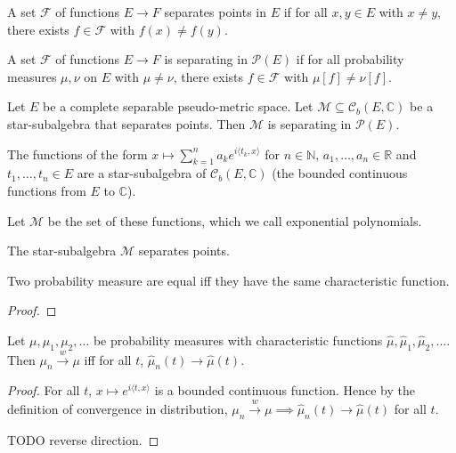 \begin{definition}\label{def:separating}
A set $\mathcal F$ of functions $E \to F$ separates points in $E$ if for all $x, y \in E$ with $x \ne y$, there exists $f \in \mathcal F$ with $f(x) \ne f(y)$.

A set $\mathcal F$ of functions $E \to F$ is separating in $\mathcal P(E)$ if for all probability measures $\mu, \nu$ on $E$ with $\mu \ne \nu$, there exists $f \in \mathcal F$ with $\mu[f] \ne \nu[f]$.
\end{definition}

\begin{theorem}\label{thm:separating_starSubalgebra}
Let $E$ be a complete separable pseudo-metric space. Let $\mathcal M \subseteq \mathcal C_b(E, \mathbb{C})$ be a star-subalgebra that separates points. Then $\mathcal M$ is separating in $\mathcal P(E)$.
\end{theorem}

\begin{lemma}\label{lem:starSubalgebra_expPoly}
The functions of the form $x \mapsto \sum_{k=1}^n a_k e^{i\langle t_k, x\rangle}$ for $n \in \mathbb{N}$, $a_1, \ldots, a_n \in \mathbb{R}$ and $t_1, \ldots, t_n \in E$ are a star-subalgebra of $\mathcal C_b(E, \mathbb{C})$ (the bounded continuous functions from $E$ to $\mathbb{C}$). 
\end{lemma}

Let $\mathcal M$ be the set of these functions, which we call exponential polynomials.

\begin{lemma}\label{lem:separating_expPoly}
The star-subalgebra $\mathcal M$ separates points.
\end{lemma}

\begin{lemma}\label{lem:ext_charFun}
Two probability measure are equal iff they have the same characteristic function.
\end{lemma}

\begin{proof}
\end{proof}

\begin{theorem}\label{thm:charFun_tendsto_iff_measure_tendsto}
Let $\mu, \mu_1, \mu_2, \ldots$ be probability measures with characteristic functions $\hat{\mu}, \hat{\mu}_1, \hat{\mu}_2, \ldots$. Then $\mu_n \xrightarrow{w} \mu$ iff for all $t$, $\hat{\mu}_n(t) \to \hat{\mu}(t)$.
\end{theorem}

\begin{proof}
For all $t$, $x \mapsto e^{i \langle t, x \rangle}$ is a bounded continuous function. Hence by the definition of convergence in distribution, $\mu_n \xrightarrow{w} \mu \implies \hat{\mu}_n(t) \to \hat{\mu}(t)$ for all $t$.

TODO reverse direction.
\end{proof}